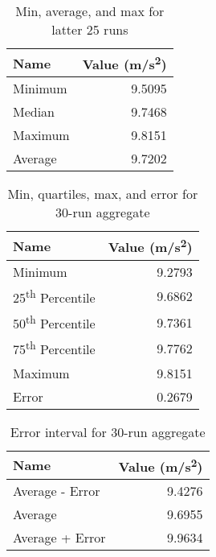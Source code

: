 %
\begin{table}[ht]
    \centering
    \begin{tabular}{l|r}
        \textbf{Name} & \textbf{Value} (m/s\textsuperscript{2}) \\
        \hline
        Minimum & 9.5095 \\
        Median & 9.7468 \\
        Maximum & 9.8151 \\
        Average & 9.7202 \\
        \hline
    \end{tabular}
    \caption{Min, average, and max for latter 25 runs}
    \label{table:01.describe.25}
\end{table}
%
\begin{table}[ht]
    \centering
    \begin{tabular}{l|r}
        \textbf{Name} & \textbf{Value} (m/s\textsuperscript{2}) \\
        \hline
        Minimum & 9.2793 \\
        25\textsuperscript{th} Percentile & 9.6862 \\
        50\textsuperscript{th} Percentile & 9.7361 \\
        75\textsuperscript{th} Percentile & 9.7762 \\
        Maximum & 9.8151 \\
        Error & 0.2679 \\
        \hline
    \end{tabular}
    \caption{Min, quartiles, max, and error for 30-run aggregate}
    \label{table:01.describe.30}
\end{table}
%
\begin{table}[ht]
    \centering
    \begin{tabular}{l|r}
        \textbf{Name} & \textbf{Value} (m/s\textsuperscript{2}) \\
        \hline
        Average - Error & 9.4276 \\
        Average & 9.6955 \\
        Average + Error & 9.9634 \\
        \hline
    \end{tabular}
    \caption{Error interval for 30-run aggregate}
    \label{table:01.error.30}
\end{table}
%
